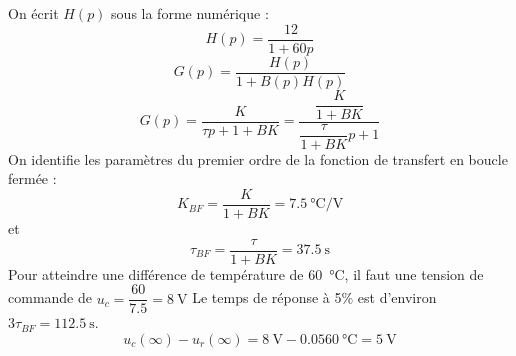 On écrit $H(p)$ sous la forme numérique :
\[
    H(p)=\dfrac{12}{1+60p}
\]
\[
    G(p)=\dfrac{H(p)}{1+B(p)H(p)}
\]
\[
    G(p)=\dfrac{K}{\tau p+1+BK}=\dfrac{\dfrac{K}{1+BK}}{\dfrac{\tau}{1+BK}p+1}
\]
On identifie les paramètres du premier ordre de la fonction de transfert en 
boucle fermée :
\[
    K_{BF}=\dfrac{K}{1+BK}=\SI{7.5}{\celsius\per\volt}
\]
et
\[
    \tau_{BF}=\dfrac{\tau}{1+BK}=\SI{37.5}{\second}
\]
Pour atteindre une différence de température de \SI{60}{\celsius}, il faut une 
tension de commande de $u_c=\dfrac{60}{7.5}=\SI{8}{\volt}$
Le temps de réponse à 5\% est d'environ $3\tau_{BF}=\SI{112.5}{\second}$.
\[
    u_c(\infty)-u_r(\infty)=\SI{8}{\volt}-0.05\SI{60}{\celsius}=\SI{5}{\volt}
\]

